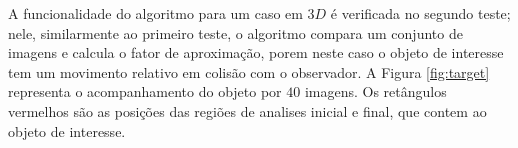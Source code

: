 A funcionalidade do algoritmo para um caso em $3D$ é verificada no segundo teste;
nele, similarmente ao primeiro teste, o algoritmo compara um conjunto de imagens 
e calcula o fator de aproximação, porem neste caso o objeto de interesse tem um movimento
relativo em colisão com o observador. A Figura \ref{fig:target} representa o 
acompanhamento do objeto por $40$ imagens. Os retângulos vermelhos
são as posições das regiões de analises inicial e final, que contem ao objeto de interesse.


